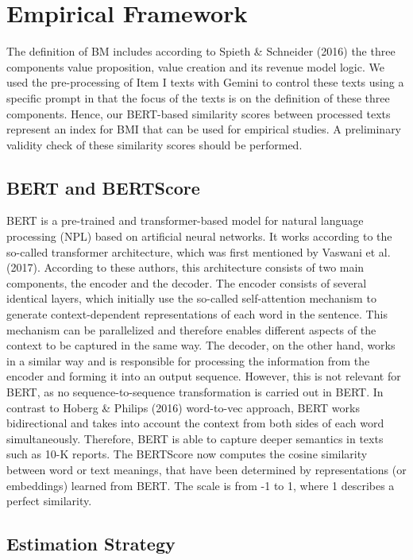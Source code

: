 \documentclass[
]{article}
\begin{document}
\section{Empirical Framework}\label{empirical-framework}

The definition of BM includes according to Spieth \& Schneider (2016)
the three components value proposition, value creation and its revenue
model logic. We used the pre-processing of Item I texts with Gemini to
control these texts using a specific prompt in that the focus of the
texts is on the definition of these three components. Hence, our
BERT-based similarity scores between processed texts represent an index
for BMI that can be used for empirical studies. A preliminary validity
check of these similarity scores should be performed.

\subsection{BERT and BERTScore}\label{bert-and-bertscore}

BERT is a pre-trained and transformer-based model for natural language
processing (NPL) based on artificial neural networks. It works according
to the so-called transformer architecture, which was first mentioned by
Vaswani et al. (2017). According to these authors, this architecture
consists of two main components, the encoder and the decoder. The
encoder consists of several identical layers, which initially use the
so-called self-attention mechanism to generate context-dependent
representations of each word in the sentence. This mechanism can be
parallelized and therefore enables different aspects of the context to
be captured in the same way. The decoder, on the other hand, works in a
similar way and is responsible for processing the information from the
encoder and forming it into an output sequence. However, this is not
relevant for BERT, as no sequence-to-sequence transformation is carried
out in BERT. In contrast to Hoberg \& Philips (2016) word-to-vec
approach, BERT works bidirectional and takes into account the context
from both sides of each word simultaneously. Therefore, BERT is able to
capture deeper semantics in texts such as 10-K reports. The BERTScore
now computes the cosine similarity between word or text meanings, that
have been determined by representations (or embeddings) learned from
BERT. The scale is from -1 to 1, where 1 describes a perfect similarity.

\subsection{Estimation Strategy}\label{estimation-strategy}
\end{document}
